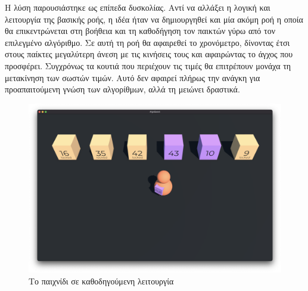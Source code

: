 Η λύση παρουσιάστηκε ως επίπεδα δυσκολίας. Αντί να αλλάξει η λογική και λειτουργία της βασικής ροής, η ιδέα ήταν να δημιουργηθεί και μία ακόμη ροή η οποία θα επικεντρώνεται στη βοήθεια και τη καθοδήγηση τον παικτών γύρω από τον επιλεγμένο αλγόριθμο. Σε αυτή τη ροή θα αφαιρεθεί το χρονόμετρο, δίνοντας έτσι στους παίκτες μεγαλύτερη άνεση με τις κινήσεις τους και αφαιρώντας το άγχος που προσφέρει. Συγχρόνως τα κουτιά που περιέχουν τις τιμές θα επιτρέπουν μονάχα τη μετακίνηση των σωστών τιμών. Αυτό δεν αφαιρεί πλήρως την ανάγκη για προαπαιτούμενη γνώση των αλγορίθμων, αλλά τη μειώνει δραστικά.

\begin{figure}[H]
    \centering
    \includegraphics[width=0.8\linewidth]{sections/4/2/images/game_guided_mode}
    \caption{Το παιχνίδι σε καθοδηγούμενη λειτουργία}
    \label{fig:game_guided_mode}
\end{figure}

